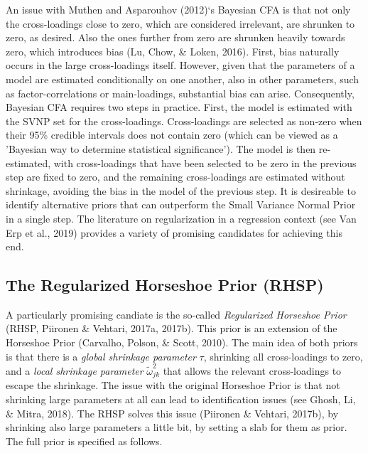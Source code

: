 \documentclass[
  english,
  man]{apa6}
\begin{document}
An issue with Muthen and Asparouhov (2012)`s Bayesian CFA is that not only the cross-loadings close to zero, which are considered irrelevant, are shrunken to zero, as desired. Also the ones further from zero are shrunken heavily towards zero, which introduces bias (Lu, Chow, \& Loken, 2016). First, bias naturally occurs in the large cross-loadings itself. However, given that the parameters of a model are estimated conditionally on one another, also in other parameters, such as factor-correlations or main-loadings, substantial bias can arise. Consequently, Bayesian CFA requires two steps in practice. First, the model is estimated with the SVNP set for the cross-loadings. Cross-loadings are selected as non-zero when their 95\% credible intervals does not contain zero (which can be viewed as a 'Bayesian way to determine statistical significance'). The model is then re-estimated, with cross-loadings that have been selected to be zero in the previous step are fixed to zero, and the remaining cross-loadings are estimated without shrinkage, avoiding the bias in the model of the previous step. It is desireable to identify alternative priors that can outperform the Small Variance Normal Prior in a single step. The literature on regularization in a regression context (see Van Erp et al., 2019) provides a variety of promising candidates for achieving this end.

\hypertarget{the-regularized-horseshoe-prior-rhsp}{%
\subsection{The Regularized Horseshoe Prior (RHSP)}\label{the-regularized-horseshoe-prior-rhsp}}

A particularly promising candiate is the so-called \emph{Regularized Horseshoe Prior} (RHSP, Piironen \& Vehtari, 2017a, 2017b). This prior is an extension of the Horseshoe Prior (Carvalho, Polson, \& Scott, 2010). The main idea of both priors is that there is a \emph{global shrinkage parameter} \(\tau\), shrinking all cross-loadings to zero, and a \emph{local shrinkage parameter} \(\tilde{\omega}_{jk}^2\) that allows the relevant cross-loadings to escape the shrinkage. The issue with the original Horseshoe Prior is that not shrinking large parameters at all can lead to identification issues (see Ghosh, Li, \& Mitra, 2018). The RHSP solves this issue (Piironen \& Vehtari, 2017b), by shrinking also large parameters a little bit, by setting a slab for them as prior. The full prior is specified as follows.
\end{document}
